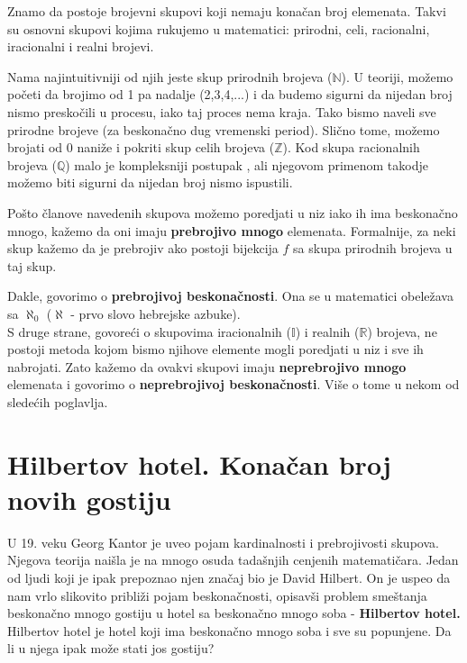\documentclass[a4paper]{article}
\begin{document}
Znamo da postoje brojevni skupovi koji nemaju konačan broj elemenata. Takvi su osnovni skupovi kojima rukujemo u matematici: prirodni, celi, racionalni, iracionalni i realni brojevi.

Nama najintuitivniji od njih jeste skup prirodnih brojeva ($\mathbb{N}$). U teoriji, možemo početi da brojimo od 1 pa nadalje (2,3,4,...) i da budemo sigurni da nijedan broj nismo preskočili u procesu, iako taj proces nema kraja. Tako bismo naveli sve prirodne brojeve (za beskonačno dug vremenski period). Slično tome, možemo brojati od 0 naniže i pokriti skup celih brojeva ($\mathbb{Z}$). Kod skupa racionalnih brojeva ($\mathbb{Q}$) malo je kompleksniji postupak \cite{Kantorov dijagonalni postupak}, ali njegovom primenom takodje možemo biti sigurni da nijedan broj nismo ispustili.

Pošto članove navedenih skupova možemo poredjati u niz iako ih ima beskonačno mnogo, kažemo da oni imaju \textbf{prebrojivo mnogo} elemenata. Formalnije, za neki skup kažemo da je prebrojiv ako postoji bijekcija $f$ sa skupa prirodnih brojeva u taj skup.

Dakle, govorimo o \textbf{prebrojivoj beskonačnosti}. Ona se u matematici obeležava sa $\aleph_{0}$ ($\aleph$ - prvo slovo hebrejske azbuke).\\

S druge strane, govoreći o skupovima iracionalnih ($\mathbb{I}$) i realnih ($\mathbb{R}$) brojeva, ne postoji metoda kojom bismo njihove elemente mogli poredjati u niz i sve ih nabrojati. Zato kažemo da ovakvi skupovi imaju \textbf{neprebrojivo mnogo} elemenata i govorimo o \textbf{neprebrojivoj beskonačnosti}. Više o tome u nekom od sledećih poglavlja.


\section{Hilbertov hotel. Konačan broj novih gostiju}
U 19. veku Georg Kantor je uveo pojam kardinalnosti i prebrojivosti skupova. Njegova teorija naišla je na mnogo osuda tadašnjih cenjenih matematičara.
Jedan od ljudi koji je ipak prepoznao njen značaj bio je David Hilbert.
On je uspeo da nam vrlo slikovito približi pojam beskonačnosti, opisavši problem smeštanja beskonačno mnogo gostiju u hotel sa beskonačno mnogo soba - \textbf{Hilbertov hotel.}
Hilbertov hotel je hotel koji ima beskonačno mnogo soba i sve su popunjene. Da li u njega ipak može stati jos gostiju?
\end{document}
